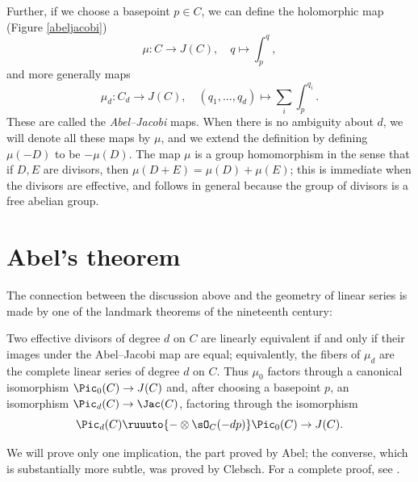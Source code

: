 Further, if we choose a basepoint  $p\in C$, we can define the holomorphic map (Figure \ref{abeljacobi})
%
$$
\mu  :  C  \to  J(C), \quad q\mapsto \int_{p}^{q},
$$
and more generally maps
$$
\mu_d
:  C_d  \to  J(C), \quad (q_1,\dots, q_d) \mapsto \sum_i \int_{p}^{q_i}.
$$
These
are called the \emph{Abel--Jacobi} maps. When there is no
%
ambiguity about $d$, we will denote all these maps  by $\mu$,  and
we extend the definition by defining $\mu(-D)$ to be $-\mu(D)$.
The map $\mu$ is a group homomorphism in the sense that if $D, E$ are divisors, then
$\mu (D+E) = \mu(D) + \mu(E)$; this is immediate when the divisors are effective, and
follows in general because the group of divisors is a free abelian group.

\section{Abel's theorem}

The connection between the discussion above and the geometry of linear
series is made by one of the landmark theorems of the nineteenth century:

\begin{theorem}\label{abel}
Two effective divisors of degree $d$ on $C$  are linearly
%
equivalent if and only if their images under the Abel--Jacobi map are
equal;
equivalently,
the fibers of $\mu_d$ are
the complete linear series of degree $d$ on $C$. Thus $\mu_0$ factors
through a canonical isomorphism
$\Pic_0(C) \to J(C)$ and, after choosing a basepoint $p$, an
isomorphism $\Pic_d(C) \to \nobreak\Jac(C)$, factoring through the isomorphism
$$
\Pic_d(C) \ruuuto {-\otimes \sO_C(-dp)} \Pic_0(C) \to J(C).
$$
\end{theorem}

We will prove only one implication,
the part proved by Abel; the converse, which is substantially more subtle, was proved by Clebsch.
For a complete proof,
see \cite[Section 2.2]{Griffiths-Harris1978}.

